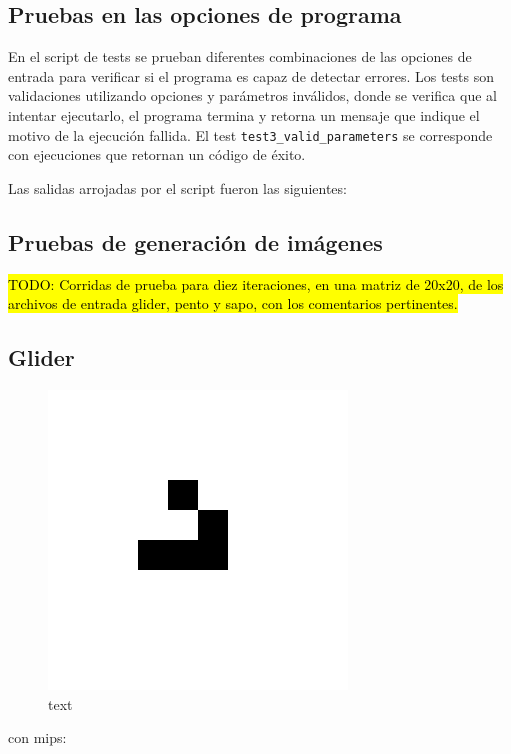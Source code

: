 \subsection{Pruebas en las opciones de programa}

En el script de tests se prueban diferentes combinaciones de las opciones de entrada para verificar si el programa es capaz de detectar errores. Los tests son validaciones utilizando opciones y parámetros inválidos, donde se verifica que al intentar ejecutarlo, el programa termina y retorna un mensaje que indique el motivo de la ejecución fallida. El test \texttt{test3\_valid\_parameters} se corresponde con ejecuciones que retornan un código de éxito. 

Las salidas arrojadas por el script fueron las siguientes:



\clearpage
\subsection{Pruebas de generación de imágenes}
\hl{TODO: Corridas de prueba para diez iteraciones, en una matriz de 20x20, de los archivos de entrada glider, pento y sapo, con los comentarios pertinentes.}

\subsection{Glider}

\begin{figure}[!htb]
	\centering
	\includegraphics[scale=0.5]{includes/gl_img/glider001.png}
	\caption{text}
\end{figure}
con mips:

